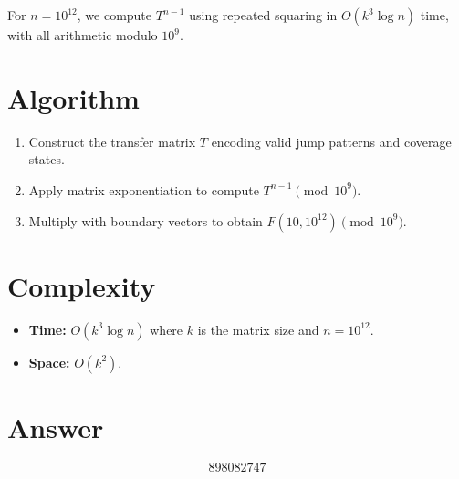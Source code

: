 \documentclass[12pt]{article}
\begin{document}
For $n = 10^{12}$, we compute $T^{n-1}$ using repeated squaring in $O(k^3 \log n)$ time, with all arithmetic modulo $10^9$.

\section{Algorithm}
\begin{enumerate}
    \item Construct the transfer matrix $T$ encoding valid jump patterns and coverage states.
    \item Apply matrix exponentiation to compute $T^{n-1} \pmod{10^9}$.
    \item Multiply with boundary vectors to obtain $F(10, 10^{12}) \pmod{10^9}$.
\end{enumerate}

\section{Complexity}
\begin{itemize}
    \item \textbf{Time:} $O(k^3 \log n)$ where $k$ is the matrix size and $n = 10^{12}$.
    \item \textbf{Space:} $O(k^2)$.
\end{itemize}

\section{Answer}

\[
\boxed{898082747}
\]
\end{document}
